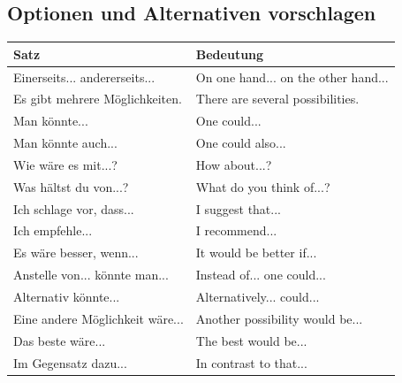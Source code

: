 \subsection{Optionen und Alternativen vorschlagen}
\begin{center}
\begin{tabular}{|l|p{8cm}|}
\hline
\textbf{Satz} & \textbf{Bedeutung} \\ \hline
Einerseits... andererseits... & On one hand... on the other hand... \\ \hline
Es gibt mehrere Möglichkeiten. & There are several possibilities. \\ \hline
Man könnte... & One could... \\ \hline
Man könnte auch... & One could also... \\ \hline
Wie wäre es mit...? & How about...? \\ \hline
Was hältst du von...? & What do you think of...? \\ \hline
Ich schlage vor, dass... & I suggest that... \\ \hline
Ich empfehle... & I recommend... \\ \hline
Es wäre besser, wenn... & It would be better if... \\ \hline
Anstelle von... könnte man... & Instead of... one could... \\ \hline
Alternativ könnte... & Alternatively... could... \\ \hline
Eine andere Möglichkeit wäre... & Another possibility would be... \\ \hline
Das beste wäre... & The best would be... \\ \hline
Im Gegensatz dazu... & In contrast to that... \\ \hline
\end{tabular}
\end{center}

